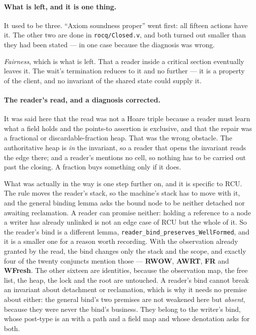 \paragraph{What is left, and it is one thing.}
It used to be three.  ``Axiom soundness proper'' went first: all fifteen actions
have it.  The other two are done in \texttt{rocq/Closed.v}, and both turned out
smaller than they had been stated --- in one case because the diagnosis was
wrong.

\emph{Fairness}, which is what is left.  That a reader inside a critical
section eventually leaves it.  The wait's termination reduces to it and no
further --- it is a property of the client, and no invariant of the shared state
could supply it.

\paragraph{The reader's read, and a diagnosis corrected.}
It was said here that the read was not a Hoare triple because a reader must
learn what a field holds and the points-to assertion is exclusive, and that the
repair was a fractional or discardable-fraction heap.  That was the wrong
obstacle.  The authoritative heap is \emph{in} the invariant, so a reader that
opens the invariant reads the edge there; and a reader's \itr{} mentions no
cell, so nothing has to be carried out past the closing.  A fraction buys
something only if it does.

What was actually in the way is one step further on, and it is specific to RCU.
The rule moves the reader's stack, so the machine's stack has to move with it,
and the general binding lemma asks the bound node to be neither detached nor
awaiting reclamation.  A reader can promise neither: holding a reference to a
node a writer has already unlinked is not an edge case of RCU but the whole of
it.  So the reader's bind is a different lemma,
\texttt{reader\_bind\_preserves\_WellFormed}, and it is a smaller one for a
reason worth recording.  With the observation already granted by the read, the
bind changes only the stack and the scope, and exactly four of the twenty
conjuncts mention those --- \textbf{RWOW}, \textbf{AWRT}, \textbf{FR} and
\textbf{WFresh}.  The other sixteen are identities, because the observation
map, the free list, the heap, the lock and the root are untouched.  A reader's
bind cannot break an invariant about detachment or reclamation, which is why it
needs no premise about either: the general bind's two premises are not weakened
here but \emph{absent}, because they were never the bind's business.  They
belong to the writer's bind, whose post-type is an \itr{} with a path and a
field map and whose denotation asks for both.

